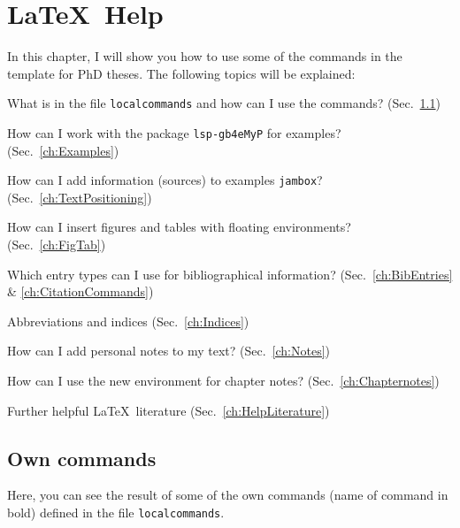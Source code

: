 \chapter{\LaTeX\ Help}
\label{ch:Help}


In this chapter, I will show you how to use some of the commands in the template for PhD theses. The following topics will be explained:

\begin{itemize*}
	\item What is in the file \texttt{localcommands} and how can I use the commands? (Sec.~\ref{ch:Commands})
	
	\item How can I work with the package \texttt{lsp-gb4eMyP} for examples? (Sec.~\ref{ch:Examples})
	
	\item How can I add information (\fe sources) to examples \texttt{jambox}? (Sec.~\ref{ch:TextPositioning})
		
	\item How can I insert figures and tables with floating environments? (Sec.~\ref{ch:FigTab})
	
	\item Which entry types can I use for bibliographical information? (Sec.~\ref{ch:BibEntries} \& \ref{ch:CitationCommands})
		
	\item Abbreviations and indices (Sec.~\ref{ch:Indices})

	\item How can I add personal notes to my text? (Sec.~\ref{ch:Notes})

	\item How can I use the new environment for chapter notes? (Sec.~\ref{ch:Chapternotes})	

	\item Further helpful \LaTeX\ literature (Sec.~\ref{ch:HelpLiterature})
\end{itemize*}


\section{Own commands}
\label{ch:Commands}


Here, you can see the result of some of the own commands (name of command in bold) defined in the file \texttt{localcommands}. 


